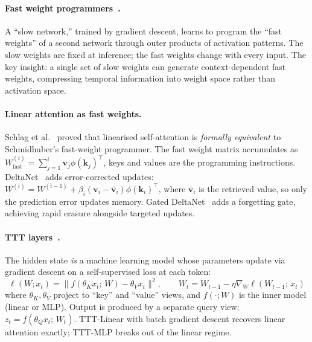 \documentclass[11pt, a4paper]{article}
\theoremstyle{plain}
\theoremstyle{definition}
\theoremstyle{remark}
\begin{document}
\paragraph{Fast weight programmers~\cite{schmidhuber1992fast}.}
A ``slow network,'' trained by gradient descent, learns to program the ``fast weights'' of a second network through outer products of activation patterns.
The slow weights are fixed at inference; the fast weights change with every input.
The key insight: a single set of slow weights can generate context-dependent fast weights, compressing temporal information into weight space rather than activation space.

\paragraph{Linear attention as fast weights.}
Schlag et al.~\cite{schlag2021linear} proved that linearised self-attention is \emph{formally equivalent} to Schmidhuber's fast-weight programmer.
The fast weight matrix accumulates as $W_{\mathrm{fast}}^{(i)} = \sum_{j=1}^{i} \mathbf{v}_j \phi(\mathbf{k}_j)^\top$, keys and values are the programming instructions.
DeltaNet~\cite{yang2024deltanet} adds error-corrected updates: $W^{(i)} = W^{(i-1)} + \beta_i (\mathbf{v}_i - \bar{\mathbf{v}}_i) \phi(\mathbf{k}_i)^\top$, where $\bar{\mathbf{v}}_i$ is the retrieved value, so only the prediction error updates memory.
Gated DeltaNet~\cite{gateddeltanet2025} adds a forgetting gate, achieving rapid erasure alongside targeted updates.

\paragraph{TTT layers~\cite{sun2024ttt}.}
The hidden state \emph{is} a machine learning model whose parameters update via gradient descent on a self-supervised loss at each token:
\begin{equation}
\ell(W; x_t) = \| f(\theta_K x_t;\, W) - \theta_V x_t \|^2, \qquad
W_t = W_{t-1} - \eta \nabla_W \ell(W_{t-1};\, x_t)
\end{equation}
where $\theta_K, \theta_V$ project to ``key'' and ``value'' views, and $f(\cdot; W)$ is the inner model (linear or MLP).
Output is produced by a separate query view: $z_t = f(\theta_Q x_t;\, W_t)$.
TTT-Linear with batch gradient descent recovers linear attention exactly; TTT-MLP breaks out of the linear regime.
\end{document}
